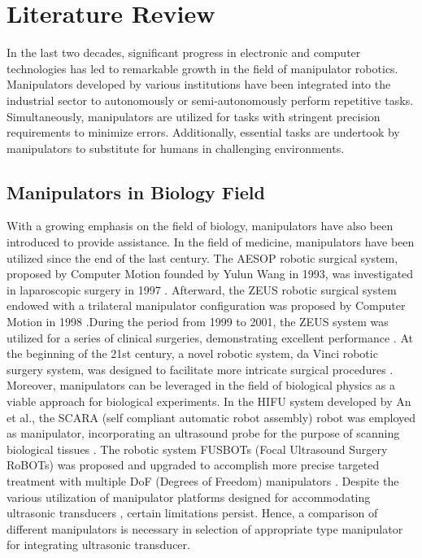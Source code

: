 \section{Literature Review} 
In the last two decades, significant progress in electronic and computer technologies has led to remarkable 
growth in the field of manipulator robotics. Manipulators developed by various institutions have been integrated 
into the industrial sector to autonomously or semi-autonomously perform repetitive tasks. Simultaneously, 
manipulators are utilized for tasks with stringent precision requirements to minimize errors. Additionally, 
essential tasks are undertook by manipulators to substitute for humans in challenging environments. 
\subsection{Manipulators in Biology Field}
With a growing emphasis on the field of biology, manipulators have also been introduced to provide assistance. 
In the field of medicine, manipulators have been utilized since the end of the last century. The AESOP robotic 
surgical system, proposed by Computer Motion founded by Yulun Wang in 1993, was investigated in laparoscopic 
surgery in 1997 \cite{AESOP}. Afterward, the ZEUS robotic surgical system endowed with a trilateral manipulator 
configuration was proposed by Computer Motion in 1998 \cite{ZEUS}.During the period from 1999 to 2001, the ZEUS 
system was utilized for a series of clinical surgeries, demonstrating excellent performance 
\cite{ZEUS_example1,ZEUS_example2,ZEUS_example3}. At the beginning of the 21st century, a novel 
robotic system, da Vinci robotic surgery system, was designed to facilitate more intricate surgical procedures 
\cite{da_Vinci}. Moreover, manipulators can be leveraged in the field of biological physics as a viable approach 
for biological experiments. In the HIFU system developed by An et al., the SCARA (self compliant automatic robot 
assembly) robot was employed as manipulator, incorporating an ultrasound probe for the purpose of scanning 
biological tissues \cite{HIFU2017}. The robotic system FUSBOTs (Focal Ultrasound Surgery RoBOTs) was proposed 
and upgraded to accomplish more precise targeted treatment with multiple DoF (Degrees of Freedom) manipulators 
\cite{FUSBOT,FUSBOT_example1,FUSBOT_example2}. Despite the various utilization of manipulator platforms 
designed for accommodating ultrasonic transducers \cite{6DOF_HIFU,6DOF_HIFU_comp,6DOF_HIFU_ABB}, 
certain limitations persist. Hence, a comparison of different manipulators is necessary in selection of appropriate 
type manipulator for integrating ultrasonic transducer. 

